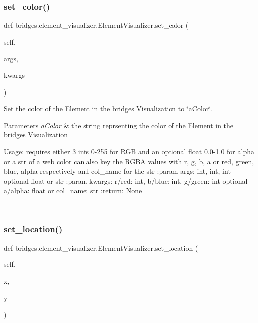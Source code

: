 \subsubsection{\texorpdfstring{set\+\_\+color()}{set\_color()}}
{\footnotesize\ttfamily def bridges.\+element\+\_\+visualizer.\+Element\+Visualizer.\+set\+\_\+color (\begin{DoxyParamCaption}\item[{}]{self,  }\item[{}]{args,  }\item[{}]{kwargs }\end{DoxyParamCaption})}



Set the color of the Element in the bridges Visualization to \char`\"{}a\+Color\char`\"{}. 


\begin{DoxyParams}{Parameters}
{\em a\+Color} & the string reprsenting the color of the Element in the bridges Visualization\begin{DoxyVerb}Usage: requires either 3 ints 0-255 for RGB and an optional float 0.0-1.0 for alpha or a str of a web color
can also key the RGBA values with r, g, b, a or red, green, blue, alpha respectively and col_name for the str
:param args: int, int, int optional float or str
:param kwargs: r/red: int, b/blue: int, g/green: int optional a/alpha: float or col_name: str
:return: None
\end{DoxyVerb}
 \\
\hline
\end{DoxyParams}
\mbox{\label{classbridges_1_1element__visualizer_1_1_element_visualizer_a7aef4402f2de7e88a3260bbec3a708a7}} 
\subsubsection{\texorpdfstring{set\+\_\+location()}{set\_location()}}
{\footnotesize\ttfamily def bridges.\+element\+\_\+visualizer.\+Element\+Visualizer.\+set\+\_\+location (\begin{DoxyParamCaption}\item[{}]{self,  }\item[{}]{x,  }\item[{}]{y }\end{DoxyParamCaption})}




